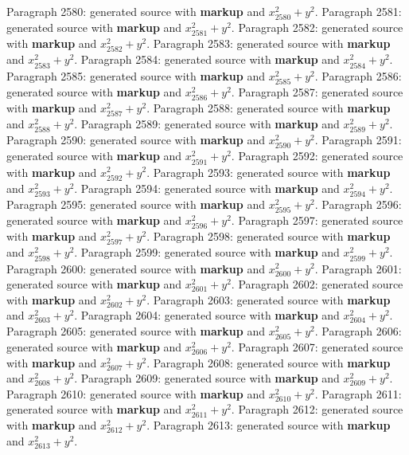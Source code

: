 \documentclass{article}
\begin{document}
Paragraph 2580: generated source with \textbf{markup} and $x_{2580}^2 + y^2$.
Paragraph 2581: generated source with \textbf{markup} and $x_{2581}^2 + y^2$.
Paragraph 2582: generated source with \textbf{markup} and $x_{2582}^2 + y^2$.
Paragraph 2583: generated source with \textbf{markup} and $x_{2583}^2 + y^2$.
Paragraph 2584: generated source with \textbf{markup} and $x_{2584}^2 + y^2$.
Paragraph 2585: generated source with \textbf{markup} and $x_{2585}^2 + y^2$.
Paragraph 2586: generated source with \textbf{markup} and $x_{2586}^2 + y^2$.
Paragraph 2587: generated source with \textbf{markup} and $x_{2587}^2 + y^2$.
Paragraph 2588: generated source with \textbf{markup} and $x_{2588}^2 + y^2$.
Paragraph 2589: generated source with \textbf{markup} and $x_{2589}^2 + y^2$.
Paragraph 2590: generated source with \textbf{markup} and $x_{2590}^2 + y^2$.
Paragraph 2591: generated source with \textbf{markup} and $x_{2591}^2 + y^2$.
Paragraph 2592: generated source with \textbf{markup} and $x_{2592}^2 + y^2$.
Paragraph 2593: generated source with \textbf{markup} and $x_{2593}^2 + y^2$.
Paragraph 2594: generated source with \textbf{markup} and $x_{2594}^2 + y^2$.
Paragraph 2595: generated source with \textbf{markup} and $x_{2595}^2 + y^2$.
Paragraph 2596: generated source with \textbf{markup} and $x_{2596}^2 + y^2$.
Paragraph 2597: generated source with \textbf{markup} and $x_{2597}^2 + y^2$.
Paragraph 2598: generated source with \textbf{markup} and $x_{2598}^2 + y^2$.
Paragraph 2599: generated source with \textbf{markup} and $x_{2599}^2 + y^2$.
Paragraph 2600: generated source with \textbf{markup} and $x_{2600}^2 + y^2$.
Paragraph 2601: generated source with \textbf{markup} and $x_{2601}^2 + y^2$.
Paragraph 2602: generated source with \textbf{markup} and $x_{2602}^2 + y^2$.
Paragraph 2603: generated source with \textbf{markup} and $x_{2603}^2 + y^2$.
Paragraph 2604: generated source with \textbf{markup} and $x_{2604}^2 + y^2$.
Paragraph 2605: generated source with \textbf{markup} and $x_{2605}^2 + y^2$.
Paragraph 2606: generated source with \textbf{markup} and $x_{2606}^2 + y^2$.
Paragraph 2607: generated source with \textbf{markup} and $x_{2607}^2 + y^2$.
Paragraph 2608: generated source with \textbf{markup} and $x_{2608}^2 + y^2$.
Paragraph 2609: generated source with \textbf{markup} and $x_{2609}^2 + y^2$.
Paragraph 2610: generated source with \textbf{markup} and $x_{2610}^2 + y^2$.
Paragraph 2611: generated source with \textbf{markup} and $x_{2611}^2 + y^2$.
Paragraph 2612: generated source with \textbf{markup} and $x_{2612}^2 + y^2$.
Paragraph 2613: generated source with \textbf{markup} and $x_{2613}^2 + y^2$.
\end{document}
